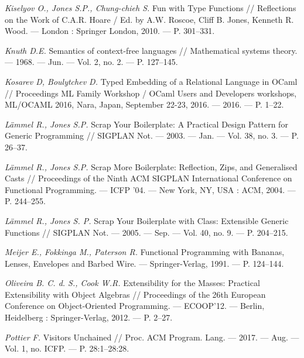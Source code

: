 \documentclass[a4paper,twoside,11pt]{article}
\numberwithin{equation}{section}
\begin{document}
\begin{thebibliography}{99}
{\em Kiselyov O., Jones S.P.,  Chung-chieh S. } Fun with
Type Functions // Reflections on the Work of C.A.R. Hoare / Ed. by
A.W. Roscoe, Cliff B. Jones, Kenneth R. Wood. — London : Springer
London, 2010. — P. 301–331. %

{\em Knuth D.E.} Semantics of context-free languages // Mathemati\-cal systems theory. — 1968. — Jun. — Vol. 2, no. 2. — P. 127–145. 

{\em Kosarev D, Boulytchev D.} Typed Embedding of a Relational Language in OCaml // Proceedings ML Family Workshop /
OCaml Users and Developers workshops, ML/OCAML 2016, Nara,
Japan, September 22-23, 2016. — 2016. — P. 1–22. 

{\em L\"ammel R., Jones S.P.} Scrap Your Boilerplate: A Practical Design Pattern for Generic Programming // SIGPLAN Not. —
2003. — Jan. — Vol. 38, no. 3. — P. 26–37. 

{\em L\"ammel R., Jones S.P.} Scrap More Boilerplate: Reflection, Zips, and Generalised Casts // Proceedings of the Ninth ACM
SIGPLAN International Conference on Functional Programming. —
ICFP ’04. — New York, NY, USA : ACM, 2004. — P. 244–255. 

{\em L\"ammel R., Jones S. P.} Scrap Your Boilerplate with Class:
Extensible Generic Functions // SIGPLAN Not. — 2005. — Sep. —
Vol. 40, no. 9. — P. 204–215. %

{\em Meijer E., Fokkinga M., Paterson R.} Functional Programming with Bananas, Lenses, Envelopes and Barbed Wire. — Springer-Verlag, 1991. — P. 124–144.

{\em Oliveira B. C. d. S., Cook W.R.} Extensibility for the
Masses: Practical Extensibility with Object Algebras // Proceedings of the 26th European Conference on Object-Oriented Programming. — ECOOP’12. — Berlin, Heidelberg : Springer-Verlag,
2012. — P. 2–27.

{\em Pottier F.} Visitors Unchained // Proc. ACM Program.
Lang. — 2017. — Aug. — Vol. 1, no. ICFP. — P. 28:1–28:28. 


\end{thebibliography}
\end{document}

